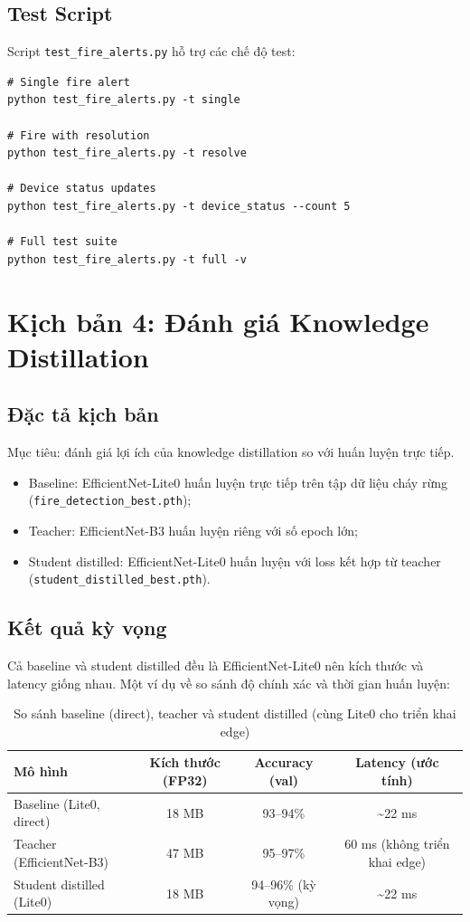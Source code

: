 \documentclass[12pt,a4paper]{report}
\begin{document}
\subsection{Test Script}

Script \texttt{test\_fire\_alerts.py} hỗ trợ các chế độ test:
\begin{verbatim}
# Single fire alert
python test_fire_alerts.py -t single

# Fire with resolution
python test_fire_alerts.py -t resolve

# Device status updates
python test_fire_alerts.py -t device_status --count 5

# Full test suite
python test_fire_alerts.py -t full -v
\end{verbatim}

\section{Kịch bản 4: Đánh giá Knowledge Distillation}

\subsection{Đặc tả kịch bản}

Mục tiêu: đánh giá lợi ích của knowledge distillation so với huấn luyện trực tiếp.
\begin{itemize}
  \item Baseline: EfficientNet-Lite0 huấn luyện trực tiếp trên tập dữ liệu cháy rừng (\texttt{fire\_detection\_best.pth});
  \item Teacher: EfficientNet-B3 huấn luyện riêng với số epoch lớn;
  \item Student distilled: EfficientNet-Lite0 huấn luyện với loss kết hợp từ teacher (\texttt{student\_distilled\_best.pth}).
\end{itemize}

\subsection{Kết quả kỳ vọng}

Cả baseline và student distilled đều là EfficientNet-Lite0 nên kích thước và latency giống nhau. Một ví dụ về so sánh độ chính xác và thời gian huấn luyện:
\begin{table}[h]
  \centering
  \caption{So sánh baseline (direct), teacher và student distilled (cùng Lite0 cho triển khai edge)}
  \begin{tabular}{lccc}
    \toprule
    Mô hình & Kích thước (FP32) & Accuracy (val) & Latency (ước tính) \\
    \midrule
    Baseline (Lite0, direct) & 18 MB & 93--94\% & \textasciitilde 22 ms \\
    Teacher (EfficientNet-B3) & 47 MB & 95--97\% & 60 ms (không triển khai edge) \\
    Student distilled (Lite0) & 18 MB & 94--96\% (kỳ vọng) & \textasciitilde 22 ms \\
    \bottomrule
  \end{tabular}
\end{table}
\end{document}
